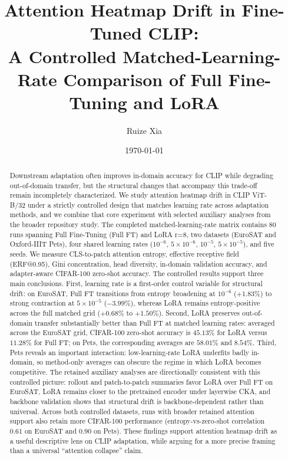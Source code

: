 \documentclass[10pt]{article}
\title{Attention Heatmap Drift in Fine-Tuned CLIP:\\A Controlled Matched-Learning-Rate Comparison of Full Fine-Tuning and LoRA}
\author{Ruize Xia}
\date{\today}
\begin{document}
\maketitle

\begin{abstract}
Downstream adaptation often improves in-domain accuracy for CLIP while degrading out-of-domain transfer, but the structural changes that accompany this trade-off remain incompletely characterized. We study attention heatmap drift in CLIP ViT-B/32 under a strictly controlled design that matches learning rate across adaptation methods, and we combine that core experiment with selected auxiliary analyses from the broader repository study. The completed matched-learning-rate matrix contains 80 runs spanning Full Fine-Tuning (Full FT) and LoRA r=8, two datasets (EuroSAT and Oxford-IIIT Pets), four shared learning rates ($10^{-6}$, $5{\times}10^{-6}$, $10^{-5}$, $5{\times}10^{-5}$), and five seeds. We measure CLS-to-patch attention entropy, effective receptive field (ERF@0.95), Gini concentration, head diversity, in-domain validation accuracy, and adapter-aware CIFAR-100 zero-shot accuracy. The controlled results support three main conclusions. First, learning rate is a first-order control variable for structural drift: on EuroSAT, Full FT transitions from entropy broadening at $10^{-6}$ ($+1.83\%$) to strong contraction at $5{\times}10^{-5}$ ($-3.99\%$), whereas LoRA remains entropy-positive across the full matched grid ($+0.68\%$ to $+1.50\%$). Second, LoRA preserves out-of-domain transfer substantially better than Full FT at matched learning rates: averaged across the EuroSAT grid, CIFAR-100 zero-shot accuracy is $45.13\%$ for LoRA versus $11.28\%$ for Full FT; on Pets, the corresponding averages are $58.01\%$ and $8.54\%$. Third, Pets reveals an important interaction: low-learning-rate LoRA underfits badly in-domain, so method-only averages can obscure the regime in which LoRA becomes competitive. The retained auxiliary analyses are directionally consistent with this controlled picture: rollout and patch-to-patch summaries favor LoRA over Full FT on EuroSAT, LoRA remains closer to the pretrained encoder under layerwise CKA, and backbone validation shows that structural drift is backbone-dependent rather than universal. Across both controlled datasets, runs with broader retained attention support also retain more CIFAR-100 performance (entropy-vs-zero-shot correlation $0.61$ on EuroSAT and $0.90$ on Pets). These findings support attention heatmap drift as a useful descriptive lens on CLIP adaptation, while arguing for a more precise framing than a universal ``attention collapse'' claim.
\end{abstract}
\end{document}
